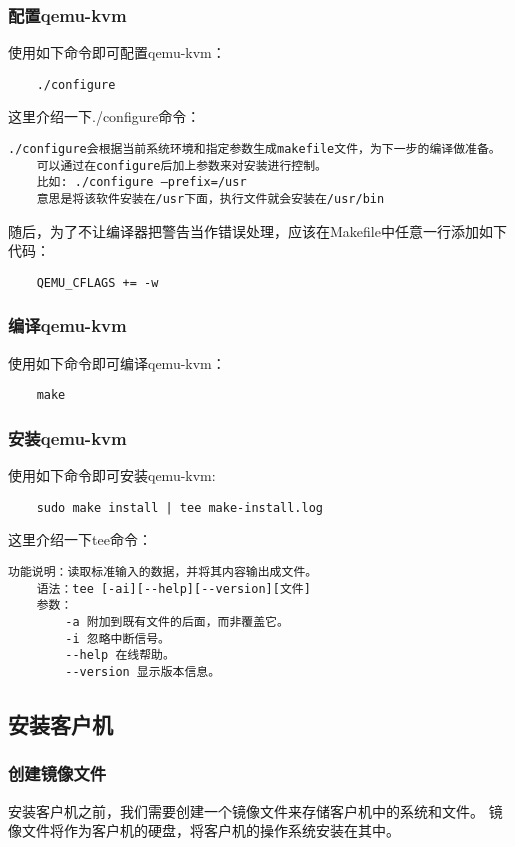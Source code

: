 \documentclass[a4paper,left=2.5cm,right=2.5cm,11pt]{article}
\begin{document}
\subsubsection{配置qemu-kvm}
	使用如下命令即可配置qemu-kvm：
	\begin{lstlisting}
	./configure
	\end{lstlisting}

	这里介绍一下./configure命令：
	\begin{lstlisting}[numberstyle = \color{white}]
	./configure会根据当前系统环境和指定参数生成makefile文件，为下一步的编译做准备。
	可以通过在configure后加上参数来对安装进行控制。
	比如: ./configure –prefix=/usr
	意思是将该软件安装在/usr下面，执行文件就会安装在/usr/bin
	\end{lstlisting}

	随后，为了不让编译器把警告当作错误处理，应该在Makefile中任意一行添加如下代码：
	\begin{lstlisting}
	QEMU_CFLAGS += -w
	\end{lstlisting}

\subsubsection{编译qemu-kvm}
	使用如下命令即可编译qemu-kvm：
	\begin{lstlisting}
	make
	\end{lstlisting}

\subsubsection{安装qemu-kvm}
	使用如下命令即可安装qemu-kvm:
	\begin{lstlisting}
	sudo make install | tee make-install.log
	\end{lstlisting}

	这里介绍一下tee命令：
	\begin{lstlisting}[numberstyle = \color{white}]
	功能说明：读取标准输入的数据，并将其内容输出成文件。
	语法：tee [-ai][--help][--version][文件]
	参数：
		-a 附加到既有文件的后面，而非覆盖它。
		-i 忽略中断信号。
		--help 在线帮助。
		--version 显示版本信息。
	\end{lstlisting}

\subsection{安装客户机}
\subsubsection{创建镜像文件}
	安装客户机之前，我们需要创建一个镜像文件来存储客户机中的系统和文件。
	镜像文件将作为客户机的硬盘，将客户机的操作系统安装在其中。\par
\end{document}
